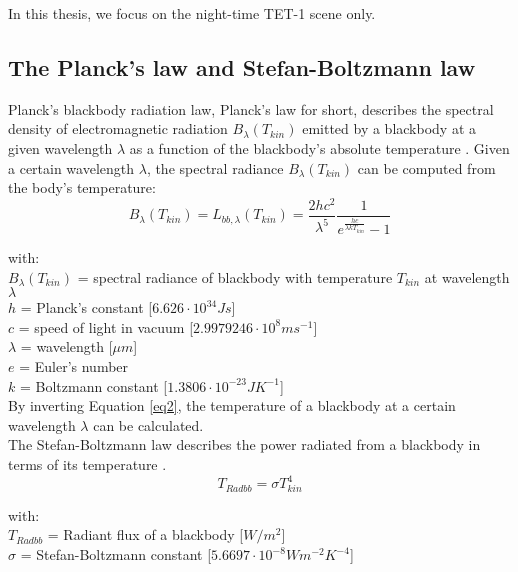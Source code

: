 \noindent In this thesis, we focus on the night-time TET-1 scene only. \\


\subsection{The Planck's law and Stefan-Boltzmann law}
Planck's blackbody radiation law, Planck's law for short, describes the spectral density of electromagnetic radiation $B_{\lambda}(T_{kin})$ emitted by a blackbody at a given wavelength $\lambda$ as a function of the blackbody's absolute temperature \parencite{Reference208}. Given a certain wavelength $\lambda$, the spectral radiance $B_{\lambda}(T_{kin})$ can be computed from the body's temperature:
\begin{equation}
\label{eq2}
B_{\lambda}(T_{kin}) = L_{bb, \lambda}(T_{kin}) = \frac{2hc^2}{\lambda ^5} \frac{1}{e^{\frac{hc}{\lambda k T_{kin}}} - 1}
\end{equation}

\noindent with:\\
\indent $B_{\lambda}(T_{kin})$ = spectral radiance of blackbody with temperature $T_{kin}$ at wavelength $\lambda$\\
\indent $h$ = Planck's constant [$6.626 \cdot 10^{34} J s$]\\
\indent $c$ = speed of light in vacuum [$2.9979246 \cdot 10^8 m s^{-1}$]\\
\indent $\lambda$ = wavelength [$\mu m$]\\
\indent $e$ = Euler's number\\
\indent $k$ = Boltzmann constant [$1.3806 \cdot 10^{-23} J K^{-1}$]\\

\noindent By inverting Equation \eqref{eq2}, the temperature of a blackbody at a certain wavelength $\lambda$ can be calculated.\\

\noindent The Stefan-Boltzmann law describes the power radiated from a blackbody in terms of its temperature \parencite{Reference201, Reference209}.
\begin{equation}
\label{eq3}
T_{Radbb} = \sigma T_{kin}^4
\end{equation}

\noindent with:\\
\indent $T_{Radbb}$ = Radiant flux of a blackbody [$W/m^2$]\\
\indent $\sigma$ = Stefan-Boltzmann constant [$5.6697 \cdot 10^{-8} W m^{-2} K^{-4}$]\\

